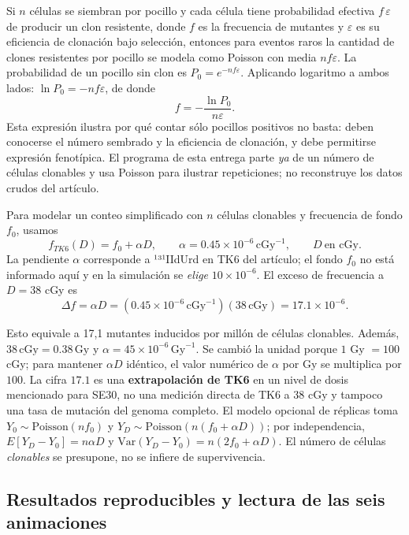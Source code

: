 \documentclass[11pt,a4paper,oneside]{article}
\begin{document}
Si \(n\) células se siembran por pocillo y cada célula tiene probabilidad efectiva \(f\,\varepsilon\) de producir un clon resistente, donde \(f\) es la frecuencia de mutantes y \(\varepsilon\) es su eficiencia de clonación bajo selección, entonces para eventos raros la cantidad de clones resistentes por pocillo se modela como Poisson con media \(nf\varepsilon\). La probabilidad de un pocillo sin clon es \(P_0=e^{-nf\varepsilon}\). Aplicando logaritmo a ambos lados: \(\ln P_0=-nf\varepsilon\), de donde \[\boxed{f=-\frac{\ln P_0}{n\varepsilon}.}\] Esta expresión ilustra por qué contar sólo pocillos positivos no basta: deben conocerse el número sembrado y la eficiencia de clonación, y debe permitirse expresión fenotípica. El programa de esta entrega parte \emph{ya} de un número de células clonables y usa Poisson para ilustrar repeticiones; no reconstruye los datos crudos del artículo.

Para modelar un conteo simplificado con \(n\) células clonables y frecuencia de fondo \(f_0\), usamos \[f_{TK6}(D)=f_0+\alpha D,\qquad \alpha=0.45\times10^{-6}\,\mathrm{cGy}^{-1},\qquad D\ \text{en cGy}.\] La pendiente \(\alpha\) corresponde a ¹³¹IIdUrd en TK6 del artículo; el fondo \(f_0\) no está informado aquí y en la simulación se \emph{elige} \(10\times10^{-6}\). El exceso de frecuencia a \(D=38\) cGy es \[\Delta f=\alpha D=(0.45\times10^{-6}\,\mathrm{cGy}^{-1})(38\,\mathrm{cGy})=17.1\times10^{-6}.\]

Esto equivale a 17,1 mutantes inducidos por millón de células clonables. Además, \(38\,\mathrm{cGy}=0.38\,\mathrm{Gy}\) y \(\alpha=45\times10^{-6}\,\mathrm{Gy}^{-1}\). Se cambió la unidad porque \(1\) Gy \(=100\) cGy; para mantener \(\alpha D\) idéntico, el valor numérico de \(\alpha\) por Gy se multiplica por \(100\). La cifra \(17.1\) es una \textbf{extrapolación de TK6} en un nivel de dosis mencionado para SE30, no una medición directa de TK6 a 38 cGy y tampoco una tasa de mutación del genoma completo. El modelo opcional de réplicas toma \(Y_0\sim\mathrm{Poisson}(nf_0)\) y \(Y_D\sim\mathrm{Poisson}(n(f_0+\alpha D))\); por independencia, \(E[Y_D-Y_0]=n\alpha D\) y \(\mathrm{Var}(Y_D-Y_0)=n(2f_0+\alpha D)\). El número de células \emph{clonables} se presupone, no se infiere de supervivencia.

\subsection{Resultados reproducibles y lectura de las seis animaciones}\label{resultados-reproducibles-y-lectura-de-las-seis-animaciones}
\end{document}
